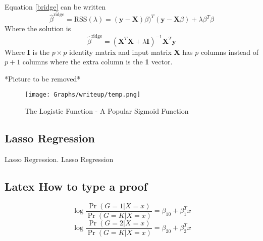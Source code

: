 \documentclass{article}
\numberwithin{equation}{subsection}
\begin{document}
Equation \eqref{bridge} can be written 
\begin{equation}
  \hat{\beta}^{\text{ridge}} = \text{RSS}(\lambda) = (\textbf{y} - \textbf{X})\beta)^{T}(\textbf{y} - \textbf{X}\beta) + \lambda \beta^{T} \beta
\end{equation}
Where the solution is 
\begin{equation}
  \hat{\beta}^{\text{ridge}} = (\textbf{X}^{T}\textbf{X} + \lambda \textbf{I})^{-1} \textbf{X}^{T}\textbf{y}
\end{equation}
Where \textbf{I} is the $p \times p$ identity matrix and input matrix \textbf{X} has $p$ columns instead of $p+1$ columns
where the extra column is the \textbf{1} vector.

*Picture to be removed*
\begin{figure}[H]
  \centering
  \texttt{[image: Graphs/writeup/temp.png]}
  \caption{The Logistic Function - A Popular Sigmoid Function}
  \label{fig:sigmoid}
\end{figure}
\subsection{Lasso Regression}
Lasso Regression.
Lasso Regression 

\subsection{Latex How to type a proof}
$$\log \frac{\Pr(G = 1 | X = x)}{\Pr(G = K | X = x)} = \beta_{10} + \beta^{T}_{1}x$$ 
$$\log \frac{\Pr(G = 2 | X = x)}{\Pr(G = K | X = x)} = \beta_{20} + \beta^{T}_{2}x$$

\newpage



\end{document}
